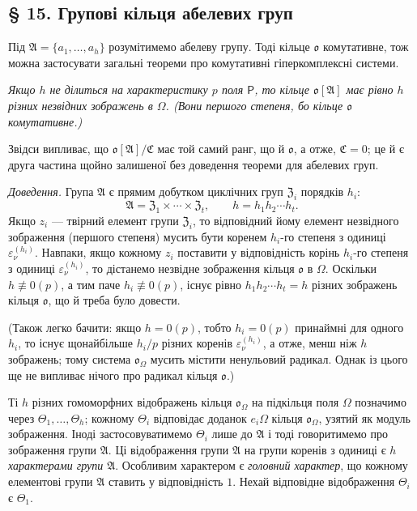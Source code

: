 \documentclass[11pt]{article}
\begin{document}
\subsection*{§ 15. Групові кільця абелевих груп}\label{die-gruppenringe-abelscher-gruppen}

Під \(\mathfrak A=\{a_1,\ldots,a_h\}\) розумітимемо абелеву групу. Тоді кільце \(\mathfrak o\) комутативне, тож можна застосувати загальні теореми про комутативні гіперкомплексні системи.

\emph{Якщо \(h\) не ділиться на характеристику \(p\) поля \(\mathsf P\), то кільце \(\mathfrak o[\mathfrak A]\) має рівно \(h\) різних незвідних зображень в \(\Omega\). (Вони першого степеня, бо кільце \(\mathfrak o\) комутативне.)}

Звідси випливає, що \(\mathfrak o[\mathfrak A]/\mathfrak C\) має той самий ранг, що й \(\mathfrak o\), а отже, \(\mathfrak C=0\); це й є друга частина щойно залишеної без доведення теореми для абелевих груп.

\emph{Доведення.} Група \(\mathfrak A\) є прямим добутком циклічних груп \(\mathfrak Z_i\) порядків \(h_i\):
\[
\mathfrak A=\mathfrak Z_1\times\cdots\times\mathfrak Z_t,\qquad
h=h_1h_2\cdots h_t .
\]
Якщо \(z_i\) --- твірний елемент групи \(\mathfrak Z_i\), то відповідний йому елемент незвідного зображення (першого степеня) мусить бути коренем \(h_i\)-го степеня з одиниці \(\varepsilon_\nu^{(h_i)}\). Навпаки, якщо кожному \(z_i\) поставити у відповідність корінь \(h_i\)-го степеня з одиниці \(\varepsilon_\nu^{(h_i)}\), то дістанемо незвідне зображення кільця \(\mathfrak o\) в \(\Omega\). Оскільки \(h\not\equiv0(p)\), а тим паче \(h_i\not\equiv0(p)\), існує рівно \(h_1h_2\cdots h_t=h\) різних зображень кільця \(\mathfrak o\), що й треба було довести.

(Також легко бачити: якщо \(h=0(p)\), тобто \(h_i=0(p)\) принаймні для одного \(h_i\), то існує щонайбільше \(h_i/p\) різних коренів \(\varepsilon_\nu^{(h_i)}\), а отже, менш ніж \(h\) зображень; тому система \(\mathfrak o_\Omega\) мусить містити ненульовий радикал. Однак із цього ще не випливає нічого про радикал кільця \(\mathfrak o\).)

Ті \(h\) різних гомоморфних відображень кільця \(\mathfrak o_\Omega\) на підкільця поля \(\Omega\) позначимо через \(\Theta_1,\ldots,\Theta_h\); кожному \(\Theta_i\) відповідає доданок \(e_i\Omega\) кільця \(\mathfrak o_\Omega\), узятий як модуль зображення. Іноді застосовуватимемо \(\Theta_i\) лише до \(\mathfrak A\) і тоді говоритимемо про зображення групи \(\mathfrak A\). Ці відображення групи \(\mathfrak A\) на групи коренів з одиниці є \emph{\(h\) характерами групи \(\mathfrak A\)}. Особливим характером є \emph{головний характер}, що кожному елементові групи \(\mathfrak A\) ставить у відповідність \(1\). Нехай відповідне відображення \(\Theta_i\) є \(\Theta_1\).
\end{document}
